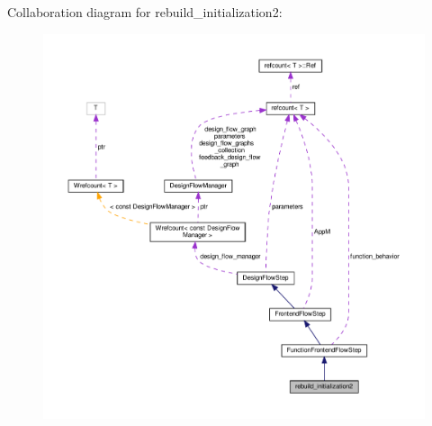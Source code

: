 Collaboration diagram for rebuild\+\_\+initialization2\+:
\nopagebreak
\begin{figure}[H]
\begin{center}
\leavevmode
\includegraphics[width=350pt]{de/de8/classrebuild__initialization2__coll__graph}
\end{center}
\end{figure}
